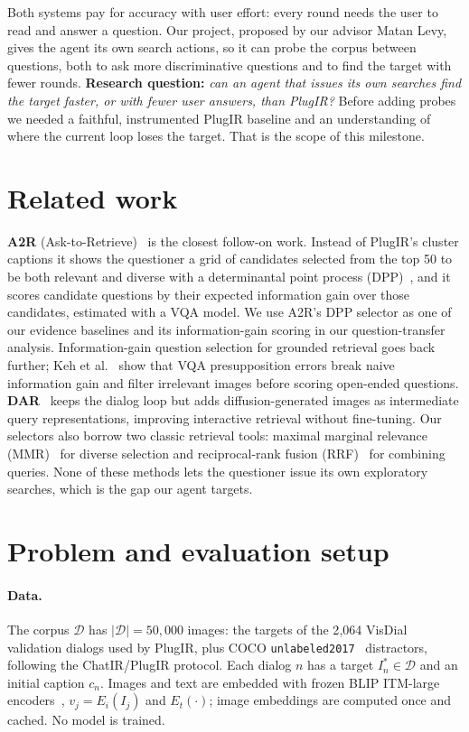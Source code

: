 \documentclass[sigconf,nonacm]{acmart}
\begin{document}
Both systems pay for accuracy with user effort: every round needs the user to read and answer a
question. Our project, proposed by our advisor Matan Levy, gives the agent its own search actions,
so it can probe the corpus between questions, both to ask more discriminative questions and to find
the target with fewer rounds. \textbf{Research question:} \emph{can an agent that issues its own
searches find the target faster, or with fewer user answers, than PlugIR?} Before adding probes we
needed a faithful, instrumented PlugIR baseline and an understanding of where the current loop
loses the target. That is the scope of this milestone.

\section{Related work}
\textbf{A2R} (Ask-to-Retrieve)~\cite{a2r} is the closest follow-on work. Instead of PlugIR's
cluster captions it shows the questioner a grid of candidates selected from the top 50 to be both
relevant and diverse with a determinantal point process (DPP)~\cite{kulesza2012dpp}, and it scores
candidate questions by their expected information gain over those candidates, estimated with a VQA
model. We use A2R's DPP selector as one of our evidence baselines and its information-gain
scoring in our question-transfer analysis.
Information-gain question selection for grounded retrieval goes back further; Keh et
al.~\cite{keh2024asking} show that VQA presupposition errors break naive information gain and
filter irrelevant images before scoring open-ended questions. \textbf{DAR}~\cite{long2025dar}
keeps the dialog loop but adds diffusion-generated images as intermediate query representations,
improving interactive retrieval without fine-tuning. Our selectors also borrow two classic
retrieval tools: maximal marginal relevance (MMR)~\cite{carbonell1998mmr} for diverse selection
and reciprocal-rank fusion (RRF)~\cite{cormack2009rrf} for combining queries.
None of these methods lets the questioner issue its own exploratory searches, which is the gap our
agent targets.

\section{Problem and evaluation setup}
\label{sec:formal}
\paragraph{Data.} The corpus $\mathcal{D}$ has $|\mathcal{D}|=50{,}000$ images: the targets of the
2{,}064 VisDial~\cite{das2017visdial} validation dialogs used by PlugIR, plus COCO
\texttt{unlabeled2017}~\cite{lin2014coco} distractors, following the ChatIR/PlugIR protocol. Each
dialog $n$ has a target $I^*_n\in\mathcal{D}$ and an initial caption $c_n$. Images and text are
embedded with frozen BLIP ITM-large encoders~\cite{li2022blip}, $v_j=E_i(I_j)$ and $E_t(\cdot)$;
image embeddings are computed once and cached. No model is trained.
\end{document}
